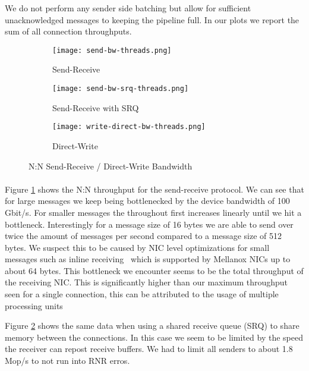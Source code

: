 We do not perform any sender side batching but allow for sufficient unacknowledged messages to keeping the pipeline full.
In our plots we report the sum of all connection throughputs.

\begin{figure}[ht]
  \centering
\begin{subfigure}[b]{0.49\textwidth}
  \centering
  \texttt{[image: send-bw-threads.png]}
  \caption{Send-Receive}
  \label{fig:plot-sndrcv-bw-thread-nosrq}
\end{subfigure}
\begin{subfigure}[b]{0.49\textwidth}
  \centering
  \texttt{[image: send-bw-srq-threads.png]}
  \caption{Send-Receive with SRQ}
  \label{fig:plot-sndrcv-bw-thread-srq}
\end{subfigure}
  \begin{subfigure}[b]{0.48\textwidth}
  \centering
  \texttt{[image: write-direct-bw-threads.png]}
  \caption{Direct-Write}
  \label{fig:plot-wdir-bw-threads}
  \end{subfigure}
\caption{N:N Send-Receive / Direct-Write Bandwidth}
  \label{fig:plot-sndrcv-bw-thread}
\end{figure}


\paragraph{} Figure \ref{fig:plot-sndrcv-bw-thread-nosrq} shows the N:N throughput for the send-receive protocol.
We can see that for large messages we keep being bottlenecked by the device bandwidth of 100 Gbit/s. For smaller
messages the throughout first increases linearly until we hit a bottleneck. Interestingly for a message size 
of 16 bytes we are able to send over twice the amount of messages per second compared to a message size of 512 bytes.
We suspect this to be caused by NIC level optimizations for small messages such as inline receiving~\cite{anuj-guide} which 
is supported by Mellanox NICs up to about 64 bytes. This bottleneck we encounter seems to be the total throughput of the 
receiving NIC. This is significantly higher than our maximum throughput seen for a single connection, this can be 
attributed to the usage of multiple processing units~\cite{anuj-guide}


Figure \ref{fig:plot-sndrcv-bw-thread-srq} shows the same data when using a shared receive queue (SRQ) to share memory
between the connections. In this case we seem to be limited by the speed the receiver can repost receive buffers. We
had to limit all senders to about 1.8 Mop/s to not run into RNR erros.

